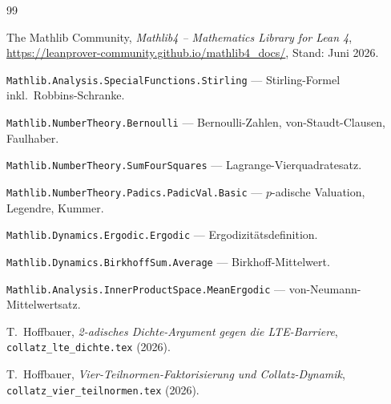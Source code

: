 \documentclass[12pt,a4paper]{article}
\newcommand{\Mathlib}[1]{\texttt{Mathlib.\allowbreak #1}}
\begin{document}
\begin{thebibliography}{99}

The Mathlib Community,
\textit{Mathlib4 -- Mathematics Library for Lean 4},
\url{https://leanprover-community.github.io/mathlib4_docs/},
Stand: Juni 2026.

\Mathlib{Analysis.SpecialFunctions.Stirling} ---
Stirling-Formel inkl.\ Robbins-Schranke.

\Mathlib{NumberTheory.Bernoulli} ---
Bernoulli-Zahlen, von-Staudt-Clausen, Faulhaber.

\Mathlib{NumberTheory.SumFourSquares} ---
Lagrange-Vierquadratesatz.

\Mathlib{NumberTheory.Padics.PadicVal.Basic} ---
$p$-adische Valuation, Legendre, Kummer.

\Mathlib{Dynamics.Ergodic.Ergodic} ---
Ergodizitätsdefinition.

\Mathlib{Dynamics.BirkhoffSum.Average} ---
Birkhoff-Mittelwert.

\Mathlib{Analysis.InnerProductSpace.MeanErgodic} ---
von-Neumann-Mittelwertsatz.

T.\ Hoffbauer,
\textit{2-adisches Dichte-Argument gegen die LTE-Barriere},
\texttt{collatz\_lte\_dichte.tex} (2026).

T.\ Hoffbauer,
\textit{Vier-Teilnormen-Faktorisierung und Collatz-Dynamik},
\texttt{collatz\_vier\_teilnormen.tex} (2026).

\end{thebibliography}
\end{document}
